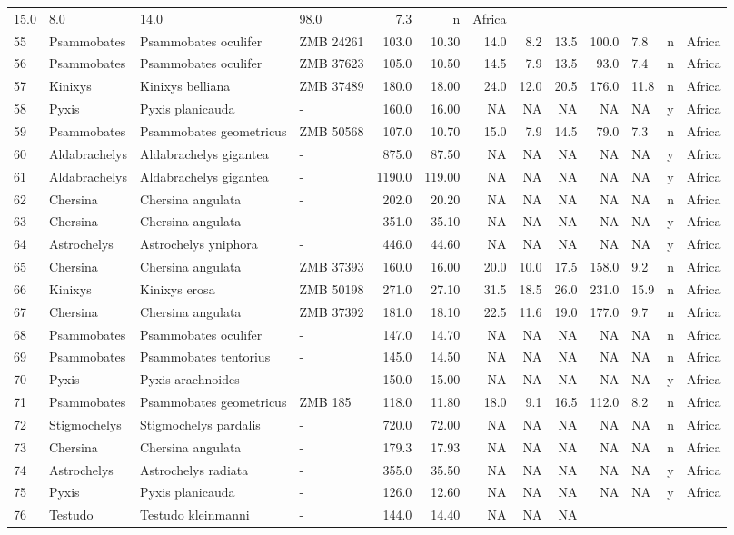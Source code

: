 \begin{landscape}
{\begin{longtable}[]{@{}llllrrrrrrlll@{}}
	15.0 & 8.0 & 14.0 & 98.0 & 7.3 & n & Africa\tabularnewline
	55 & Psammobates & Psammobates oculifer & ZMB 24261 & 103.0 & 10.30 &
	14.0 & 8.2 & 13.5 & 100.0 & 7.8 & n & Africa\tabularnewline
	56 & Psammobates & Psammobates oculifer & ZMB 37623 & 105.0 & 10.50 &
	14.5 & 7.9 & 13.5 & 93.0 & 7.4 & n & Africa\tabularnewline
	57 & Kinixys & Kinixys belliana & ZMB 37489 & 180.0 & 18.00 & 24.0 &
	12.0 & 20.5 & 176.0 & 11.8 & n & Africa\tabularnewline
	58 & Pyxis & Pyxis planicauda & - & 160.0 & 16.00 & NA & NA & NA & NA &
	NA & y & Africa\tabularnewline
	59 & Psammobates & Psammobates geometricus & ZMB 50568 & 107.0 & 10.70 &
	15.0 & 7.9 & 14.5 & 79.0 & 7.3 & n & Africa\tabularnewline
	60 & Aldabrachelys & Aldabrachelys gigantea & - & 875.0 & 87.50 & NA &
	NA & NA & NA & NA & y & Africa\tabularnewline
	61 & Aldabrachelys & Aldabrachelys gigantea & - & 1190.0 & 119.00 & NA &
	NA & NA & NA & NA & y & Africa\tabularnewline
	62 & Chersina & Chersina angulata & - & 202.0 & 20.20 & NA & NA & NA &
	NA & NA & n & Africa\tabularnewline
	63 & Chersina & Chersina angulata & - & 351.0 & 35.10 & NA & NA & NA &
	NA & NA & y & Africa\tabularnewline
	64 & Astrochelys & Astrochelys yniphora & - & 446.0 & 44.60 & NA & NA &
	NA & NA & NA & y & Africa\tabularnewline
	65 & Chersina & Chersina angulata & ZMB 37393 & 160.0 & 16.00 & 20.0 &
	10.0 & 17.5 & 158.0 & 9.2 & n & Africa\tabularnewline
	66 & Kinixys & Kinixys erosa & ZMB 50198 & 271.0 & 27.10 & 31.5 & 18.5 &
	26.0 & 231.0 & 15.9 & n & Africa\tabularnewline
	67 & Chersina & Chersina angulata & ZMB 37392 & 181.0 & 18.10 & 22.5 &
	11.6 & 19.0 & 177.0 & 9.7 & n & Africa\tabularnewline
	68 & Psammobates & Psammobates oculifer & - & 147.0 & 14.70 & NA & NA &
	NA & NA & NA & n & Africa\tabularnewline
	69 & Psammobates & Psammobates tentorius & - & 145.0 & 14.50 & NA & NA &
	NA & NA & NA & n & Africa\tabularnewline
	70 & Pyxis & Pyxis arachnoides & - & 150.0 & 15.00 & NA & NA & NA & NA &
	NA & y & Africa\tabularnewline
	71 & Psammobates & Psammobates geometricus & ZMB 185 & 118.0 & 11.80 &
	18.0 & 9.1 & 16.5 & 112.0 & 8.2 & n & Africa\tabularnewline
	72 & Stigmochelys & Stigmochelys pardalis & - & 720.0 & 72.00 & NA & NA
	& NA & NA & NA & n & Africa\tabularnewline
	73 & Chersina & Chersina angulata & - & 179.3 & 17.93 & NA & NA & NA &
	NA & NA & n & Africa\tabularnewline
	74 & Astrochelys & Astrochelys radiata & - & 355.0 & 35.50 & NA & NA &
	NA & NA & NA & y & Africa\tabularnewline
	75 & Pyxis & Pyxis planicauda & - & 126.0 & 12.60 & NA & NA & NA & NA &
	NA & y & Africa\tabularnewline
	76 & Testudo & Testudo kleinmanni & - & 144.0 & 14.40 & NA & NA & NA &

\end{longtable}}
\end{landscape}
